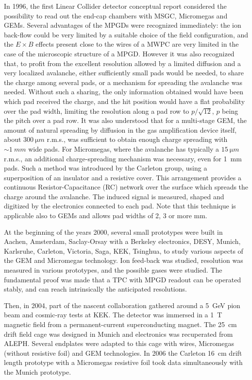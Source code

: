 In 1996, the first Linear Collider detector conceptual report \cite{Settles:1997wj} considered the possibility to read out the end-cap chambers with MSGC, Micromegas and GEMs. Several advantages of the MPGDs were recognized immediately: the ion back-flow could be very limited by a suitable choice of the field configuration, and the $E \times B$ effects present close to the wires of a MWPC are very limited in the case of the microscopic structure of a MPGD. However it was also recognized that, to profit from the
excellent resolution allowed by a limited diffusion and a very localized avalanche, either sufficiently small pads would be needed, to share the charge among several pads, or a mechanism for spreading the avalanche was needed. Without such a sharing, the only information obtained would have been which pad received the charge, and the hit position would have a flat probability over the pad width, limiting the resolution along a pad row to $p/\sqrt{12}$, $p$ being the pitch over a pad row. It was also
understood that for a multi-stage GEM, the amount of natural spreading by diffusion in the gas amplification device itself, about $\SI{300}{\micro m}$ r.m.s., was sufficient to obtain enough charge spreading with $\sim\SI{1}{mm}$ wide pads. For Micromegas, where the avalanche has typically a $\SI{15}{\micro m}$ r.m.s., an
additional charge-spreading mechanism was necessary, even for \SI{1}{mm} pads. Such a method was introduced by the Carleton group, using a superposition of an insulator and a resistive cover. This arrangement provides a continuous Resistor-Capacitance (RC) network over the surface which spreads the charge around the avalanche. The induced
signal is measured, shaped and digitized by the electronics connected to each pad. Note that this technique is applicable also to GEMs and allows pad widths of 2, 3 or more mm.

At the beginning of the years 2000, several small prototypes were built in Aachen, Amsterdam, Saclay-Orsay with a Berkeley electronics, DESY, Munich, Karlsruhe, Carleton, Victoria, Saga, KEK, Tsinghua, to study various aspects of the GEM and Micromegas technology. Ion feed-back was studied, resolution was measured in various prototypes, and the possible gases were studied. The fundamental proof was made that a TPC with MPGD readout can be operated stably, and can reach intrinsically the anticipated resolutions.

Then, in 2004, part of the nascent collaboration gathered around a \SI{5}{GeV} pion beam and cosmic-ray tests at KEK. The detector was immersed in a \SI{1}{T} magnetic field from a permanent-current superconducting magnet. The \SI{25}{cm} drift field cage was designed in Munich and electronics was recuperated from ALEPH. Several endplates were adapted to this cage with wires, Micromegas (without resistive foil) and GEM technologies. In 2006 the Carleton \SI{16}{cm} drift length prototype with a Micromegas resistive foil took data simultaneously with the Munich prototype.


